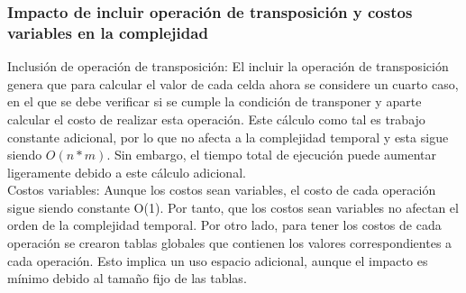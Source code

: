 \subsubsection{Impacto de incluir operación de transposición y costos variables en la complejidad}
Inclusión de operación de transposición: El incluir la operación de transposición genera que para calcular el valor de cada celda ahora se considere un cuarto caso, en el que se debe verificar si se cumple la condición de transponer y aparte calcular el costo de realizar esta operación. Este cálculo como tal es trabajo constante adicional, por lo que no afecta a la complejidad temporal y esta sigue siendo $O(n*m)$. Sin embargo, el tiempo total de ejecución puede aumentar ligeramente debido a este cálculo adicional.\\
Costos variables: Aunque los costos sean variables, el costo de cada operación sigue siendo constante O(1). Por tanto, que los costos sean variables no afectan el orden de la complejidad temporal. Por otro lado, para tener los costos de cada operación se crearon tablas globales que contienen los valores correspondientes a cada operación. Esto implica un uso espacio adicional, aunque el impacto es mínimo debido al tamaño fijo de las tablas.